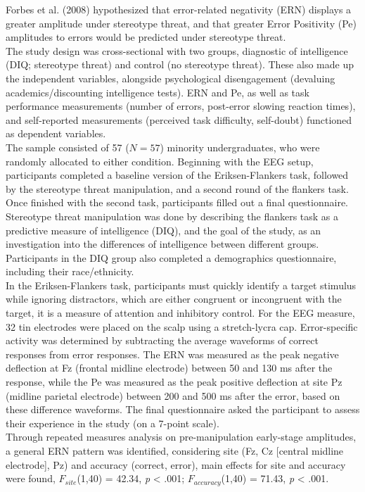 \documentclass[
  stu,floatsintext]{apa7}
\begin{document}
Forbes et al. (2008) hypothesized that error-related negativity (ERN) displays a greater amplitude under stereotype threat, and that greater Error Positivity (Pe) amplitudes to errors would be predicted under stereotype threat.\\
The study design was cross-sectional with two groups, diagnostic of intelligence (DIQ; stereotype threat) and control (no stereotype threat).
These also made up the independent variables, alongside psychological disengagement (devaluing academics/discounting intelligence tests). ERN and Pe, as well as task performance measurements (number of errors, post-error slowing reaction times), and self-reported measurements (perceived task difficulty, self-doubt) functioned as dependent variables.\\
The sample consisted of 57 (\(N = 57\)) minority undergraduates, who were randomly allocated to either condition.
Beginning with the EEG setup, participants completed a baseline version of the Eriksen-Flankers task, followed by the stereotype threat manipulation, and a second round of the flankers task.
Once finished with the second task, participants filled out a final questionnaire.
Stereotype threat manipulation was done by describing the flankers task as a predictive measure of intelligence (DIQ), and the goal of the study, as an investigation into the differences of intelligence between different groups.
Participants in the DIQ group also completed a demographics questionnaire, including their race/ethnicity.\\
In the Eriksen-Flankers task, participants must quickly identify a target stimulus while ignoring distractors, which are either congruent or incongruent with the target, it is a measure of attention and inhibitory control.
For the EEG measure, 32 tin electrodes were placed on the scalp using a stretch-lycra cap.
Error-specific activity was determined by subtracting the average waveforms of correct responses from error responses.
The ERN was measured as the peak negative deflection at Fz (frontal midline electrode) between 50 and 130 ms after the response, while the Pe was measured as the peak positive deflection at site Pz (midline parietal electrode) between 200 and 500 ms after the error, based on these difference waveforms.
The final questionnaire asked the participant to assess their experience in the study (on a 7-point scale).\\
Through repeated measures analysis on pre-manipulation early-stage amplitudes, a general ERN pattern was identified, considering site (Fz, Cz {[}central midline electrode{]}, Pz) and accuracy (correct, error), main effects for site and accuracy were found, \(F_{site}\)(1,40) = 42.34, \emph{p} \textless{} .001; \(F_{accuracy}\)(1,40) = 71.43, \emph{p} \textless{} .001.
\end{document}
